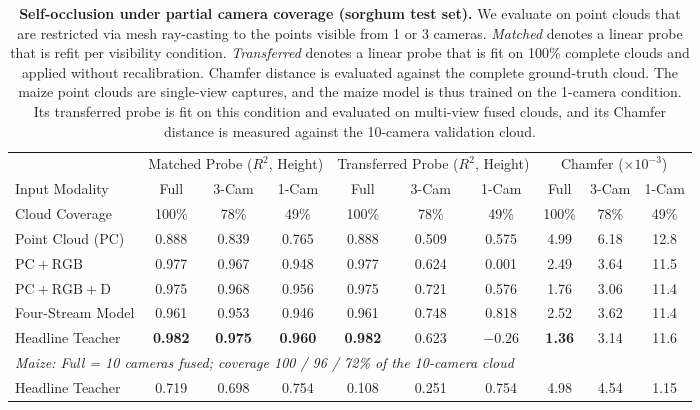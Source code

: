 \documentclass[10pt,twocolumn,letterpaper]{article}
\begin{document}
\begin{table}[t]
  \caption{\textbf{Self-occlusion under partial camera coverage (sorghum test set).} We evaluate on point clouds that are restricted via mesh ray-casting to the points visible from 1 or 3 cameras. \emph{Matched} denotes a linear probe that is refit per visibility condition. \emph{Transferred} denotes a linear probe that is fit on 100\% complete clouds and applied without recalibration. Chamfer distance is evaluated against the complete ground-truth cloud. The maize point clouds are single-view captures, and the maize model is thus trained on the 1-camera condition. Its transferred probe is fit on this condition and evaluated on multi-view fused clouds, and its Chamfer distance is measured against the 10-camera validation cloud.}
  \label{tab:views}
  \centering\scriptsize
  \setlength{\tabcolsep}{3.4pt}
  \begin{tabular}{l ccc ccc ccc}
    \toprule
    & \multicolumn{3}{c}{Matched Probe ($R^2$, Height)} & \multicolumn{3}{c}{Transferred Probe ($R^2$, Height)} & \multicolumn{3}{c}{Chamfer ($\times10^{-3}$)} \\
    \cmidrule(lr){2-4}\cmidrule(lr){5-7}\cmidrule(lr){8-10}
    Input Modality & Full & 3-Cam & 1-Cam & Full & 3-Cam & 1-Cam & Full & 3-Cam & 1-Cam \\
    Cloud Coverage & 100\% & 78\% & 49\% & 100\% & 78\% & 49\% & 100\% & 78\% & 49\% \\
    \midrule
    Point Cloud (PC) & 0.888 & 0.839 & 0.765 & 0.888 & 0.509 & 0.575 & 4.99 & 6.18 & 12.8 \\
    $\mathrm{PC}+\mathrm{RGB}$ & 0.977 & 0.967 & 0.948 & 0.977 & 0.624 & 0.001 & 2.49 & 3.64 & 11.5 \\
    $\mathrm{PC}+\mathrm{RGB}+\mathrm{D}$ & 0.975 & 0.968 & 0.956 & 0.975 & 0.721 & 0.576 & 1.76 & 3.06 & 11.4 \\
    Four-Stream Model & 0.961 & 0.953 & 0.946 & 0.961 & 0.748 & 0.818 & 2.52 & 3.62 & 11.4 \\
    Headline Teacher & \textbf{0.982} & \textbf{0.975} & \textbf{0.960} & \textbf{0.982} & 0.623 & $-0.26$ & \textbf{1.36} & 3.14 & 11.6 \\
    \midrule
    \multicolumn{10}{l}{\emph{Maize: Full = 10 cameras fused; coverage 100 / 96 / 72\% of the 10-camera cloud}} \\
    Headline Teacher & 0.719 & 0.698 & 0.754 & 0.108 & 0.251 & 0.754 & 4.98 & 4.54 & 1.15 \\
    \bottomrule
  \end{tabular}
\end{table}
\end{document}
